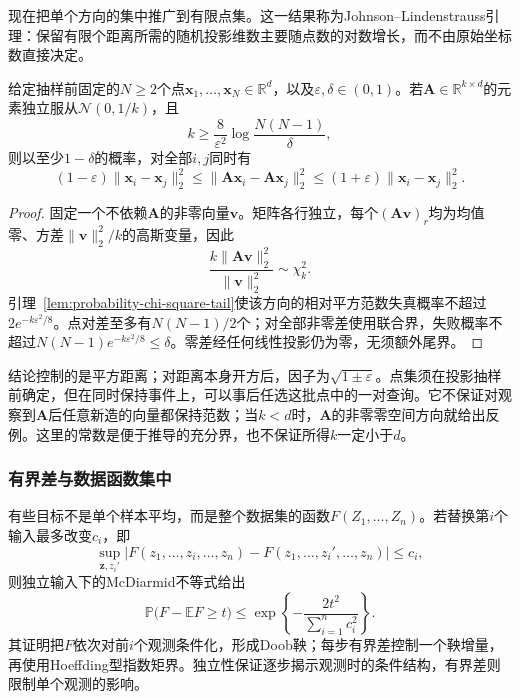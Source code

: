 现在把单个方向的集中推广到有限点集。这一结果称为Johnson--Lindenstrauss引理：保留有限个距离所需的随机投影维数主要随点数的对数增长，而不由原始坐标数直接决定。
\begin{theorem}[高斯随机投影的距离保持]
  \label{thm:probability-johnson-lindenstrauss}
  给定抽样前固定的\(N\geq2\)个点\(\bm x_1,\ldots,\bm x_N\in\mathbb R^d\)，以及\(\varepsilon,\delta\in(0,1)\)。若\(\bm A\in\mathbb R^{k\times d}\)的元素独立服从\(\mathcal N(0,1/k)\)，且
  \[
    k\geq\frac8{\varepsilon^2}\log\frac{N(N-1)}\delta,
  \]
  则以至少\(1-\delta\)的概率，对全部\(i,j\)同时有
  \begin{equation}
    (1-\varepsilon)\|\bm x_i-\bm x_j\|_2^2
    \leq\|\bm A\bm x_i-\bm A\bm x_j\|_2^2
    \leq(1+\varepsilon)\|\bm x_i-\bm x_j\|_2^2.
    \label{eq:probability-jl-distance-preservation}
  \end{equation}
\end{theorem}
\begin{proof}
固定一个不依赖\(\bm A\)的非零向量\(\bm v\)。矩阵各行独立，每个\((\bm A\bm v)_r\)均为均值零、方差\(\|\bm v\|_2^2/k\)的高斯变量，因此
\[
  \frac{k\|\bm A\bm v\|_2^2}{\|\bm v\|_2^2}\sim\chi_k^2.
\]
引理~\ref{lem:probability-chi-square-tail}使该方向的相对平方范数失真概率不超过\(2e^{-k\varepsilon^2/8}\)。点对差至多有\(N(N-1)/2\)个；对全部非零差使用联合界，失败概率不超过\(N(N-1)e^{-k\varepsilon^2/8}\leq\delta\)。零差经任何线性投影仍为零，无须额外尾界。
\end{proof}
结论控制的是平方距离；对距离本身开方后，因子为\(\sqrt{1\pm\varepsilon}\)。点集须在投影抽样前确定，但在同时保持事件上，可以事后任选这批点中的一对查询。它不保证对观察到\(\bm A\)后任意新造的向量都保持范数；当\(k<d\)时，\(\bm A\)的非零零空间方向就给出反例。这里的常数是便于推导的充分界，也不保证所得\(k\)一定小于\(d\)。

\subsubsection{有界差与数据函数集中}

有些目标不是单个样本平均，而是整个数据集的函数\(F(Z_1,\ldots,Z_n)\)。若替换第\(i\)个输入最多改变\(c_i\)，即
\[ \sup_{\bm{z},z_i'}
  |F(z_1,\ldots,z_i,\ldots,z_n)-F(z_1,\ldots,z_i',\ldots,z_n)|\leq c_i, \]
则独立输入下的McDiarmid不等式给出
\begin{equation}
  \mathbb{P}\bigl(
    F-\mathbb{E}F\geq t
  \bigr)
  \leq
  \exp\left\{
    -\frac{2t^2}{\sum_{i=1}^{n}c_i^2}
  \right\}.
  \label{eq:probability-mcdiarmid}
\end{equation}
其证明把\(F\)依次对前\(i\)个观测条件化，形成Doob鞅；每步有界差控制一个鞅增量，再使用Hoeffding型指数矩界。独立性保证逐步揭示观测时的条件结构，有界差则限制单个观测的影响。

